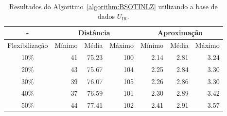 \begin{table}[!htb]
  \caption{Resultados do Algoritmo~\ref{algorithm:BSOTINLZ} utilizando a base de dados $U_{\text{IR}}$.}
  \label{table:OJKJSYXE}
  \centering
  \begin{tabular}{|c|r|r|r|r|r|r|}
    \hline
      -            & \multicolumn{3}{c|}{Distância}             & \multicolumn{3}{c|}{Aproximação}           \\ \hline
    Flexibilização & Mínimo       & Média        & Máximo       & Mínimo       & Média        & Máximo       \\ \hline  
    10\%           & 41           & 75.23        & 100          & 2.14         & 2.81         & 3.24         \\ \hline
    20\%           & 43           & 75.67        & 104          & 2.25         & 2.84         & 3.30         \\ \hline
    30\%           & 39           & 76.07        & 105          & 2.26         & 2.86         & 3.30         \\ \hline
    40\%           & 37           & 76.59        & 101          & 2.30         & 2.89         & 3.42         \\ \hline
    50\%           & 44           & 77.41        & 102          & 2.41         & 2.91         & 3.57         \\ \hline    
  \end{tabular}
\end{table}